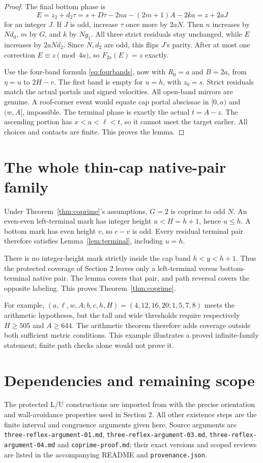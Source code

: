 \documentclass[11pt]{article}
\theoremstyle{definition}
\begin{document}
\begin{proof}
The final bottom phase is
\[
 E=z_2+d_2\tau=s+D\tau-2na-(2m+1)A-2ka=z+2aJ
\]
for an integer $J$. If $J$ is odd, increase $\tau$ once more by $2aN$. Then $n$ increases by $Nd_0$, $m$ by $G$, and $k$ by $Ng_1$. All three strict residuals stay unchanged, while $E$ increases by $2aNd_2$. Since $N,d_2$ are odd, this flips $J$'s parity. After at most one correction $E\equiv z\pmod{4a}$, so $F_{2a}(E)=z$ exactly.

Use the four-band formula \eqref{eq:fourbands}, now with $R_0=a$ and $B=2a$, from $\eta=u$ to $2H-v$. The first band is empty for $u=h$, with $z_0=s$. Strict residuals match the actual portals and signed velocities. All open-band mirrors are genuine. A roof-corner event would equate cap portal abscissae in $[0,a)$ and $(w,A]$, impossible. The terminal phase is exactly the actual $t=A-z$. The ascending portion has $x<a<\ell<t$, so it cannot meet the target earlier. All choices and contacts are finite. This proves the lemma.
\end{proof}

\section{The whole thin-cap native-pair family}
Under Theorem~\ref{thm:coprime}'s assumptions, $G=2$ is coprime to odd $N$. An even-even left-terminal mark has integer height $u<H=h+1$, hence $u\le h$. A bottom mark has even height $v$, so $c-v$ is odd. Every residual terminal pair therefore satisfies Lemma~\ref{lem:terminal}, including $u=h$.

There is no integer-height mark strictly inside the cap band $h<y<h+1$. Thus the protected coverage of Section 2 leaves only a left-terminal versus bottom-terminal native pair. The lemma covers that pair, and path reversal covers the opposite labeling. This proves Theorem~\ref{thm:coprime}.

For example, $(a,\ell,w,A;b,c,h,H)=(4,12,16,20;1,5,7,8)$ meets the arithmetic hypotheses, but the tall and wide thresholds require respectively $H\ge505$ and $A\ge644$. The arithmetic theorem therefore adds coverage outside both sufficient metric conditions. This example illustrates a proved infinite-family statement; finite path checks alone would not prove it.

\section{Dependencies and remaining scope}
The protected L/U constructions are imported from \cite{eightwall} with the precise orientation and wall-avoidance properties used in Section 2. All other existence steps are the finite interval and congruence arguments given here. Source arguments are \texttt{three-reflex-argument-01.md}, \texttt{three-reflex-argument-03.md}, \texttt{three-reflex-argument-04.md} and \texttt{coprime-proof.md}; their exact versions and scoped reviews are listed in the accompanying README and \texttt{provenance.json}.
\end{document}
